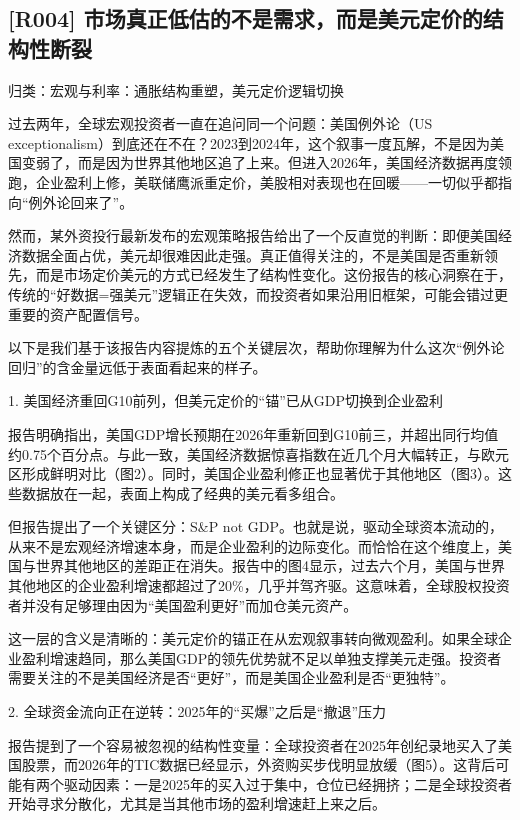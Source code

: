 \documentclass[11pt]{ctexart}
\begin{document}
\subsection{[R004] 市场真正低估的不是需求，而是美元定价的结构性断裂}
{\small\color{refgray}归类：宏观与利率：通胀结构重塑，美元定价逻辑切换}

过去两年，全球宏观投资者一直在追问同一个问题：美国例外论（US exceptionalism）到底还在不在？2023到2024年，这个叙事一度瓦解，不是因为美国变弱了，而是因为世界其他地区追了上来。但进入2026年，美国经济数据再度领跑，企业盈利上修，美联储鹰派重定价，美股相对表现也在回暖——一切似乎都指向“例外论回来了”。

然而，某外资投行最新发布的宏观策略报告给出了一个反直觉的判断：即便美国经济数据全面占优，美元却很难因此走强。真正值得关注的，不是美国是否重新领先，而是市场定价美元的方式已经发生了结构性变化。这份报告的核心洞察在于，传统的“好数据=强美元”逻辑正在失效，而投资者如果沿用旧框架，可能会错过更重要的资产配置信号。

以下是我们基于该报告内容提炼的五个关键层次，帮助你理解为什么这次“例外论回归”的含金量远低于表面看起来的样子。

1. 美国经济重回G10前列，但美元定价的“锚”已从GDP切换到企业盈利

报告明确指出，美国GDP增长预期在2026年重新回到G10前三，并超出同行均值约0.75个百分点。与此一致，美国经济数据惊喜指数在近几个月大幅转正，与欧元区形成鲜明对比（图2）。同时，美国企业盈利修正也显著优于其他地区（图3）。这些数据放在一起，表面上构成了经典的美元看多组合。

但报告提出了一个关键区分：S\&P not GDP。也就是说，驱动全球资本流动的，从来不是宏观经济增速本身，而是企业盈利的边际变化。而恰恰在这个维度上，美国与世界其他地区的差距正在消失。报告中的图4显示，过去六个月，美国与世界其他地区的企业盈利增速都超过了20\%，几乎并驾齐驱。这意味着，全球股权投资者并没有足够理由因为“美国盈利更好”而加仓美元资产。

这一层的含义是清晰的：美元定价的锚正在从宏观叙事转向微观盈利。如果全球企业盈利增速趋同，那么美国GDP的领先优势就不足以单独支撑美元走强。投资者需要关注的不是美国经济是否“更好”，而是美国企业盈利是否“更独特”。

2. 全球资金流向正在逆转：2025年的“买爆”之后是“撤退”压力

报告提到了一个容易被忽视的结构性变量：全球投资者在2025年创纪录地买入了美国股票，而2026年的TIC数据已经显示，外资购买步伐明显放缓（图5）。这背后可能有两个驱动因素：一是2025年的买入过于集中，仓位已经拥挤；二是全球投资者开始寻求分散化，尤其是当其他市场的盈利增速赶上来之后。
\end{document}
